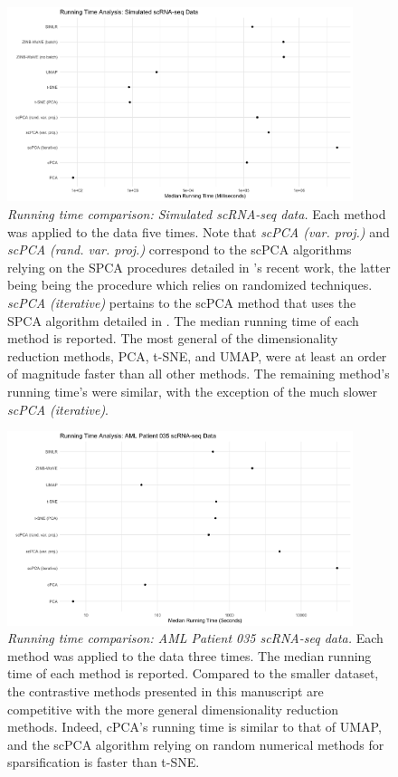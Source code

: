 \documentclass{article}
\begin{document}
\begin{figure}
    \centering
    \includegraphics[width = 0.9\textwidth]{figures/rt_analsysis_sim_data.png}
    \caption{
    {\em Running time comparison: Simulated scRNA-seq data.} Each method was applied to the data five times. Note that \textit{scPCA (var. proj.)} and \textit{scPCA (rand. var. proj.)} correspond to the scPCA algorithms relying on the SPCA procedures detailed in \citet{erichson2018sparse}'s recent work, the latter being being the procedure which relies on randomized techniques. \textit{scPCA (iterative)} pertains to the scPCA method that uses the SPCA algorithm detailed in \citet{Zou2006}. The median running time of each method is reported. The most general of the dimensionality reduction methods, PCA, t-SNE, and UMAP, were at least an order of magnitude faster than all other methods. The remaining method's running time's were similar, with the exception of the much slower \textit{scPCA (iterative)}.
    }
    \label{fig:rt_sim_sc_rna-seq}
\end{figure}

\begin{figure}
    \centering
    \includegraphics[width = 0.9\textwidth]{figures/rt_analsysis_aml035.png}
    \caption{
    {\em Running time comparison: AML Patient 035 scRNA-seq data.} Each method was applied to the data three times. The median running time of each method is reported. Compared to the smaller dataset, the contrastive methods presented in this manuscript are competitive with the more general dimensionality reduction methods. Indeed, cPCA's running time is similar to that of UMAP, and the scPCA algorithm relying on random numerical methods for sparsification is faster than t-SNE.
    }
    \label{fig:rt_aml035}
\end{figure}

\newpage



 
\end{document}
